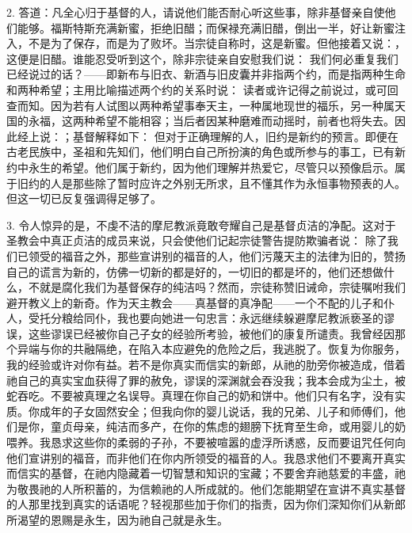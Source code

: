 2. 答道：凡全心归于基督的人，请说他们能否耐心听这些事，除非基督亲自使他们能够。福斯特斯充满新蜜，拒绝旧醋；而保禄充满旧醋，倒出一半，好让新蜜注入，不是为了保存，而是为了败坏。当宗徒自称时，这是新蜜。但他接着又说：，这便是旧醋。谁能忍受听到这个，除非宗徒亲自安慰我们说： 我们何必重复我们已经说过的话？——即新布与旧衣、新酒与旧皮囊并非指两个约，而是指两种生命和两种希望；主用比喻描述两个约的关系时说： 读者或许记得之前说过，或可回查而知。因为若有人试图以两种希望事奉天主，一种属地现世的福乐，另一种属天国的永福，这两种希望不能相容；当后者因某种磨难而动摇时，前者也将失去。因此经上说：；基督解释如下： 但对于正确理解的人，旧约是新约的预言。即便在古老民族中，圣祖和先知们，他们明白自己所扮演的角色或所参与的事工，已有新约中永生的希望。他们属于新约，因为他们理解并热爱它，尽管只以预像启示。属于旧约的人是那些除了暂时应许之外别无所求，且不懂其作为永恒事物预表的人。但这一切已反复强调得足够了。\par

3. 令人惊异的是，不虔不洁的摩尼教派竟敢夸耀自己是基督贞洁的净配。这对于圣教会中真正贞洁的成员来说，只会使他们记起宗徒警告提防欺骗者说： 除了我们已领受的福音之外，那些宣讲别的福音的人，他们污蔑天主的法律为旧的，赞扬自己的谎言为新的，仿佛一切新的都是好的，一切旧的都是坏的，他们还想做什么，不就是腐化我们为基督保存的纯洁吗？然而，宗徒称赞旧诫命，宗徒嘱咐我们避开教义上的新奇。作为天主教会——真基督的真净配——一个不配的儿子和仆人，受托分粮给同仆，我也要向她进一句忠言：永远继续躲避摩尼教派亵圣的谬误，这些谬误已经被你自己子女的经验所考验，被他们的康复所谴责。我曾经因那个异端与你的共融隔绝，在陷入本应避免的危险之后，我逃脱了。恢复为你服务，我的经验或许对你有益。若不是你真实而信实的新郎，从祂的肋旁你被造成，借着祂自己的真实宝血获得了罪的赦免，谬误的深渊就会吞没我；我本会成为尘土，被蛇吞吃。不要被真理之名误导。真理在你自己的奶和饼中。他们只有名字，没有实质。你成年的子女固然安全；但我向你的婴儿说话，我的兄弟、儿子和师傅们，他们是你，童贞母亲，纯洁而多产，在你的焦虑的翅膀下抚育至生命，或用婴儿的奶喂养。我恳求这些你的柔弱的子孙，不要被喧嚣的虚浮所诱惑，反而要诅咒任何向他们宣讲别的福音，而非他们在你内所领受的福音的人。我恳求他们不要离开真实而信实的基督，在祂内隐藏着一切智慧和知识的宝藏；不要舍弃祂慈爱的丰盛，祂为敬畏祂的人所积蓄的，为信赖祂的人所成就的。他们怎能期望在宣讲不真实基督的人那里找到真实的话语呢？轻视那些加于你们的指责，因为你们深知你们从新郎所渴望的恩赐是永生，因为祂自己就是永生。\par

